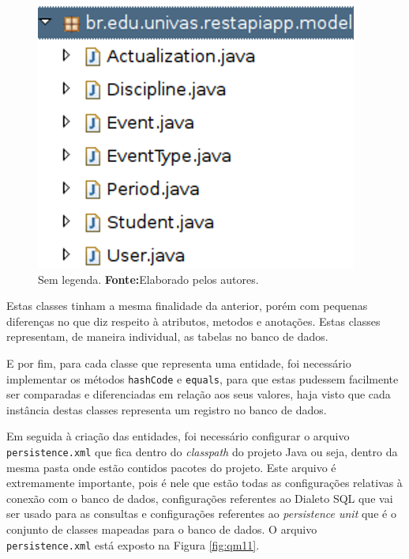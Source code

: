 	
	\begin{figure}[h!]
		\centerline{\includegraphics[scale=0.8]{./imagens/2_q_metodologico/4_procedimentos_resultados/43_webservice/432_desenvolvimento/desws12.png}}
		\caption[Sem legenda]{Sem legenda.
			\textbf{Fonte:}Elaborado pelos autores.}
		\label{fig:desws12}
	\end{figure}
	
	\pagebreak
	
	\par Estas classes tinham a mesma finalidade da anterior, porém com pequenas
diferenças no que diz respeito à atributos, metodos e anotações. Estas classes
representam, de maneira individual, as tabelas no banco de dados.

	\par E por fim, para cada classe que representa uma entidade, foi necessário
implementar os métodos \texttt{hashCode} e \texttt{equals}, para que estas
pudessem facilmente ser comparadas e diferenciadas em relação aos seus
valores, haja visto que cada instância destas classes representa um registro
no banco de dados.
	
	\par Em seguida à criação das entidades, foi necessário configurar o arquivo
\texttt{persistence.xml} que fica dentro do \textit{classpath} do projeto
Java ou seja, dentro da mesma pasta onde estão contidos pacotes do
projeto. Este arquivo é extremamente importante, pois é nele que estão todas
as configurações relativas à conexão com o banco de dados, configurações
referentes ao Dialeto SQL que vai ser usado para as consultas e configurações
referentes ao \textit{persistence unit} que é o conjunto de classes mapeadas
para o banco de dados.	O arquivo \texttt{persistence.xml} está exposto na
Figura \ref{fig:qm11}.

